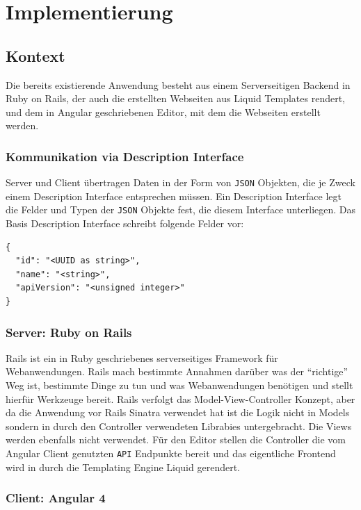 \section{Implementierung}
\label{sec:implementation-analysis}

\subsection{Kontext}

Die bereits existierende Anwendung besteht aus einem Serverseitigen Backend in
Ruby on Rails, der auch die erstellten Webseiten aus Liquid Templates rendert,
und dem in Angular geschriebenen Editor, mit dem die Webseiten erstellt werden.

\subsubsection{Kommunikation via Description Interface}

Server und Client übertragen Daten in der Form von \texttt{JSON} Objekten, die
je Zweck einem Description Interface entsprechen müssen. Ein Description
Interface legt die Felder und Typen der \texttt{JSON} Objekte fest, die diesem Interface
unterliegen. Das Basis Description Interface schreibt folgende Felder vor:

\begin{verbatim}
{
  "id": "<UUID as string>",
  "name": "<string>",
  "apiVersion": "<unsigned integer>"
}
\end{verbatim}

\subsubsection{Server: Ruby on Rails}

Rails ist ein in Ruby geschriebenes serverseitiges Framework für
Webanwendungen. Rails mach bestimmte Annahmen darüber was der ``richtige'' Weg
ist, bestimmte Dinge zu tun und was Webanwendungen benötigen und stellt hierfür
Werkzeuge bereit. Rails verfolgt das Model-View-Controller Konzept, aber da die
Anwendung vor Rails Sinatra verwendet hat ist die Logik nicht in Models sondern
in durch den Controller verwendeten Librabies untergebracht. Die Views werden
ebenfalls nicht verwendet. Für den Editor stellen die Controller die vom Angular
Client genutzten \texttt{API} Endpunkte bereit und das eigentliche Frontend wird
in durch die Templating Engine Liquid gerendert.

\subsubsection{Client: Angular 4}

